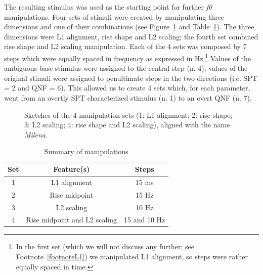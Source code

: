 The resulting stimulus was used as the starting point for further \textit{f0} manipulations. Four sets of stimuli were created by manipulating three dimensions and one of their combinations (see Figure~\ref{fig304} and Table~\ref{tab31}). The three dimensions were L1 alignment, rise shape and L2 scaling; the fourth set combined rise shape and L2 scaling manipulation. Each of the 4 sets was composed by 7 steps which were equally spaced in frequency as expressed in Hz.\footnote{In the first set (which we will not discuss any further; see Footnote~\ref{footnoteL1}) we manipulated L1 alignment, so steps were rather equally spaced in time.} Values of the ambiguous base stimulus were assigned to the central step (n. 4); values of the original stimuli were assigned to penultimate steps in the two directions (i.e. SPT = 2 and QNF = 6). This allowed us to create 4 sets which, for each parameter, went from an overtly SPT characterized stimulus (n. 1) to an overt QNF (n. 7). 

\begin{figure}
\centering
{}
\caption{Sketches of the 4 manipulation sets (1: L1 alignment; 2: rise shape; 3: L2 scaling; 4: rise shape and L2 scaling), aligned with the name \textit{Milena}.}
\label{fig304}\end{figure}

\begin{table}[h]
\centering
\begin{tabular}{c c c}
Set & Feature(s) & Steps \\
\hline
1 & L1 alignment & 15 ms \\
2 & Rise midpoint & 15 Hz \\
3 & L2 scaling & 10 Hz \\
4 & Rise midpoint and L2 scaling & 15 and 10 Hz \\
\end{tabular}
\caption{Summary of manipulations}
\label{tab31}\end{table}


